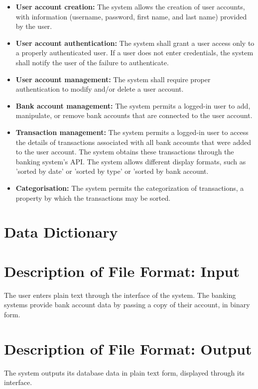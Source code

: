 \documentclass[11pt]{article}
\newcounter{use case ID}
\newcounter{req ID}
\begin{document}
\begin{itemize}
    \item  \textbf{User account creation:} The system allows the creation of user accounts, with information (username, password, first name, and last name) provided by the user.
    \item \textbf{User account authentication:} The system shall grant a user access only to a properly authenticated user. If a user does not enter credentials, the system shall notify the user of the failure to authenticate.
    \item \textbf{User account management:} The system shall require proper authentication to modify and/or delete a user account.
    \item  \textbf{Bank account management:} The system permits a logged-in user to add, manipulate, or remove bank accounts that are connected to the user account.
    \item  \textbf{Transaction management:} The system permits a logged-in user to access the details of transactions associated with all bank accounts that were added to the user account. The system obtains these transactions through the banking system's API. The system allows different display formats, such as 'sorted by date' or 'sorted by type' or 'sorted by bank account.
    \item \textbf{Categorisation:} The system permits the categorization of transactions, a property by which the transactions may be sorted.
    \end{itemize}

\section{Data Dictionary}

\appendix

\section{Description of File Format: Input}

The user enters plain text through the interface of the system. The banking systems provide bank account data by passing a copy of their account, in binary form.

\section{Description of File Format: Output}

The system outputs its database data in plain text form, displayed through its interface.
\end{document}
